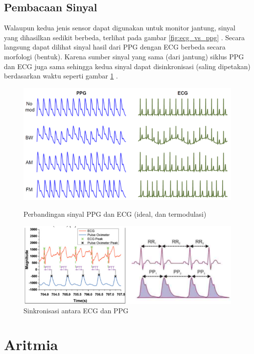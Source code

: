 \subsection{Pembacaan Sinyal}
Walaupun kedua jenis sensor dapat digunakan untuk monitor jantung, sinyal yang dihasilkan sedikit berbeda, terlihat pada gambar \ref{fig:ecg_vs_ppg} \cite{ppg_vs_ecg}. Secara langsung dapat dilihat sinyal hasil dari PPG dengan ECG berbeda secara morfologi (bentuk). Karena sumber sinyal yang sama (dari jantung) siklus PPG dan ECG juga sama sehingga kedua sinyal dapat disinkronisasi (saling dipetakan) berdasarkan waktu seperti gambar \ref{fig:ecg_vs_ppg2} \cite{ecg_syncro}.
\begin{figure}[h!]
    \centering
    \includegraphics[scale=0.5]{images/ecg_vs_ppg.png}
    \caption{Perbandingan sinyal PPG dan ECG (ideal, dan termodulasi)}
    \label{fig:ecg_vs_ppg}
    \includegraphics[scale=0.5]{images/similarity.png}
    \caption{Sinkronisasi antara ECG dan PPG}
    \label{fig:ecg_vs_ppg2}
\end{figure}

\section{Aritmia}